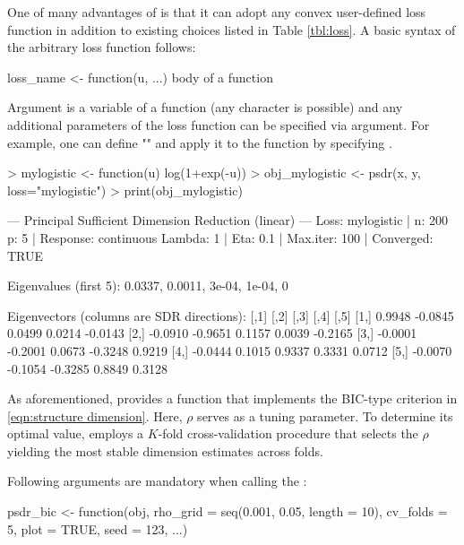 One of many advantages of  is that it can adopt any convex user-defined loss function in addition to existing choices listed in Table \ref{tbl:loss}.
A basic syntax of the arbitrary loss function follows:
\begin{example}
 loss_name <- function(u, ...){ body of a function }
\end{example}
Argument  is a variable of a function  (any character is possible) and any additional parameters of the loss function can be specified via  argument.
For example, one can define "" and apply it to the function  by specifying .
\begin{example}
 > mylogistic <- function(u) log(1+exp(-u))
 > obj_mylogistic <- psdr(x, y, loss="mylogistic")
 > print(obj_mylogistic)
\end{example}
\begin{example}
 --- Principal Sufficient Dimension Reduction (linear) ---
 Loss: mylogistic  | n: 200  p: 5  | Response: continuous 
 Lambda: 1  | Eta: 0.1  | Max.iter: 100  | Converged: TRUE 

 Eigenvalues (first 5):  0.0337, 0.0011, 3e-04, 1e-04, 0 

 Eigenvectors (columns are SDR directions):
         [,1]    [,2]    [,3]    [,4]    [,5]
 [1,]  0.9948 -0.0845  0.0499  0.0214 -0.0143
 [2,] -0.0910 -0.9651  0.1157  0.0039 -0.2165
 [3,] -0.0001 -0.2001  0.0673 -0.3248  0.9219
 [4,] -0.0444  0.1015  0.9337  0.3331  0.0712
 [5,] -0.0070 -0.1054 -0.3285  0.8849  0.3128
\end{example}

As aforementioned,  provides a function  that implements the BIC-type criterion in \eqref{eqn:structure dimension}.
{Here, $\rho$ serves as a tuning parameter. To determine its optimal value,  employs a $K$-fold cross-validation procedure that selects the $\rho$ yielding the most stable dimension estimates across folds.} 

\noindent
Following arguments are mandatory when calling the :

\begin{example}
psdr_bic <- function(obj, rho_grid = seq(0.001, 0.05, length = 10), cv_folds = 5,
                      plot = TRUE, seed = 123, ...)
\end{example}


